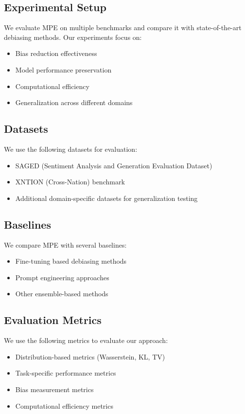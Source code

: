 \subsection{Experimental Setup}
We evaluate MPE on multiple benchmarks and compare it with state-of-the-art debiasing methods. Our experiments focus on:

\begin{itemize}
    \item Bias reduction effectiveness
    \item Model performance preservation
    \item Computational efficiency
    \item Generalization across different domains
\end{itemize}

\subsection{Datasets}
We use the following datasets for evaluation:

\begin{itemize}
    \item SAGED (Sentiment Analysis and Generation Evaluation Dataset)
    \item XNTION (Cross-Nation) benchmark
    \item Additional domain-specific datasets for generalization testing
\end{itemize}

\subsection{Baselines}
We compare MPE with several baselines:

\begin{itemize}
    \item Fine-tuning based debiasing methods
    \item Prompt engineering approaches
    \item Other ensemble-based methods
\end{itemize}

\subsection{Evaluation Metrics}
We use the following metrics to evaluate our approach:

\begin{itemize}
    \item Distribution-based metrics (Wasserstein, KL, TV)
    \item Task-specific performance metrics
    \item Bias measurement metrics
    \item Computational efficiency metrics
\end{itemize}

